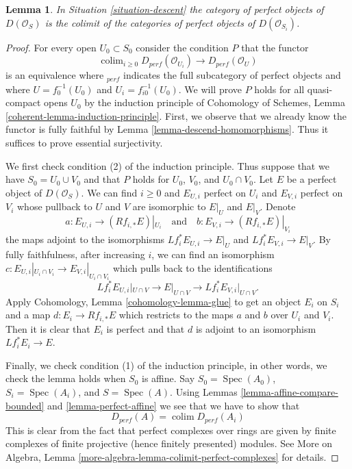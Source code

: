 \documentclass{stacks-project}
\theoremstyle{plain}
\newtheorem{lemma}[subsection]{Lemma}
\theoremstyle{definition}
\theoremstyle{remark}
\numberwithin{equation}{subsection}
\def\colim{\mathop{\mathrm{colim}}\nolimits}
\def\Spec{\mathop{\mathrm{Spec}}}
\begin{document}
\begin{lemma}
\label{lemma-descend-perfect}
In Situation \ref{situation-descent} the category of perfect
objects of $D(\mathcal{O}_S)$ is the colimit of the categories
of perfect objects of $D(\mathcal{O}_{S_i})$.
\end{lemma}

\begin{proof}
For every open $U_0 \subset S_0$ consider the condition $P$ that
the functor
$$
\colim_{i \geq 0} D_{perf}(\mathcal{O}_{U_i})
\longrightarrow
D_{perf}(\mathcal{O}_U)
$$
is an equivalence where ${}_{perf}$ indicates the full subcategory of
perfect objects and where $U = f_0^{-1}(U_0)$ and $U_i = f_{i0}^{-1}(U_0)$.
We will prove $P$ holds for all quasi-compact opens $U_0$
by the induction principle of
Cohomology of Schemes, Lemma \ref{coherent-lemma-induction-principle}.
First, we observe that we already know the functor is fully faithful
by Lemma \ref{lemma-descend-homomorphisms}. Thus it suffices to prove
essential surjectivity.

\medskip\noindent
We first check condition (2) of the induction principle. Thus suppose
that we have $S_0 = U_0 \cup V_0$ and that $P$ holds for
$U_0$, $V_0$, and $U_0 \cap V_0$. Let $E$ be a perfect object
of $D(\mathcal{O}_S)$. We can find $i \geq 0$ and $E_{U, i}$ perfect on $U_i$
and $E_{V, i}$ perfect on $V_i$ whose pullback to $U$ and $V$ are isomorphic
to $E|_U$ and $E|_V$. Denote
$$
a : E_{U, i} \to (Rf_{i, *}E)|_{U_i}
\quad\text{and}\quad
b : E_{V, i} \to (Rf_{i, *}E)|_{V_i}
$$
the maps adjoint to the isomorphisms $Lf_i^*E_{U, i} \to E|_U$
and $Lf_i^*E_{V, i} \to E|_V$.
By fully faithfulness, after increasing $i$,
we can find an isomorphism
$c : E_{U, i}|_{U_i \cap V_i} \to E_{V, i}|_{U_i \cap V_i}$
which pulls back to the identifications 
$$
Lf_i^*E_{U, i}|_{U \cap V} \to E|_{U \cap V} \to Lf_i^*E_{V, i}|_{U \cap V}.
$$
Apply Cohomology, Lemma \ref{cohomology-lemma-glue}
to get an object $E_i$ on $S_i$ and a map $d : E_i \to Rf_{i, *}E$
which restricts to the maps $a$ and $b$ over $U_i$ and $V_i$.
Then it is clear that $E_i$ is perfect and that
$d$ is adjoint to an isomorphism $Lf_i^*E_i \to E$.

\medskip\noindent
Finally, we check condition (1) of the induction principle, in other
words, we check the lemma holds when $S_0$ is affine.
Say $S_0 = \Spec(A_0)$, $S_i = \Spec(A_i)$, and
$S = \Spec(A)$. Using Lemmas \ref{lemma-affine-compare-bounded}
and \ref{lemma-perfect-affine} we see that we have to show that
$$
D_{perf}(A) = \colim D_{perf}(A_i)
$$
This is clear from the fact that perfect complexes over rings are
given by finite complexes of finite projective (hence finitely presented)
modules. See More on Algebra, Lemma
\ref{more-algebra-lemma-colimit-perfect-complexes} for details.
\end{proof}
\end{document}
